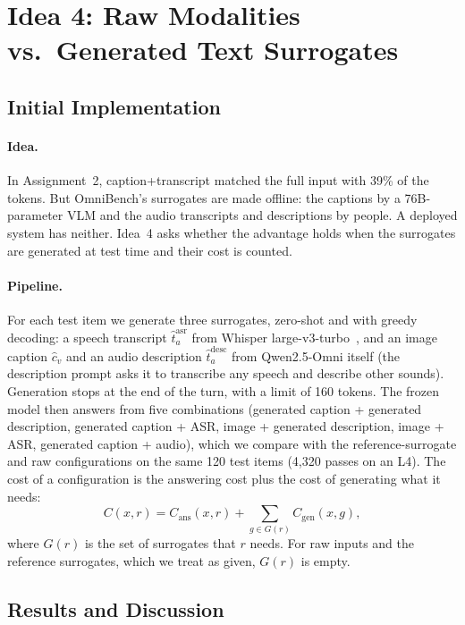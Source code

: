 \documentclass{article}
\begin{document}
\section{Idea 4: Raw Modalities vs.\ Generated Text Surrogates}
\label{sec:idea4}

\subsection{Initial Implementation}

\paragraph{Idea.} In Assignment~2, caption+transcript matched the full input with
39\% of the tokens. But OmniBench's surrogates are made offline: the captions by a
76B-parameter VLM and the audio transcripts and descriptions by people. A deployed
system has neither. Idea~4 asks whether the advantage holds when the surrogates are
generated at test time and their cost is counted.

\paragraph{Pipeline.} For each test item we generate three surrogates, zero-shot and
with greedy decoding: a speech transcript $\hat t^{\text{asr}}_a$ from Whisper
large-v3-turbo~\citep{radford2023whisper}, and an image caption $\hat c_v$ and an
audio description $\hat t^{\text{desc}}_a$ from Qwen2.5-Omni itself (the description
prompt asks it to transcribe any speech and describe other sounds). Generation stops
at the end of the turn, with a limit of 160 tokens. The frozen model then answers
from five combinations (generated caption + generated description, generated caption
+ ASR, image + generated description, image + ASR, generated caption + audio), which
we compare with the reference-surrogate and raw configurations on the same 120 test
items (4,320 passes on an L4). The cost of a configuration is the answering cost plus
the cost of generating what it needs:
\begin{equation}
C(x,r)=C_{\text{ans}}(x,r)+\sum_{g\in G(r)}C_{\text{gen}}(x,g),
\end{equation}
where $G(r)$ is the set of surrogates that $r$ needs. For raw inputs and the
reference surrogates, which we treat as given, $G(r)$ is empty.

\subsection{Results and Discussion}
\end{document}
